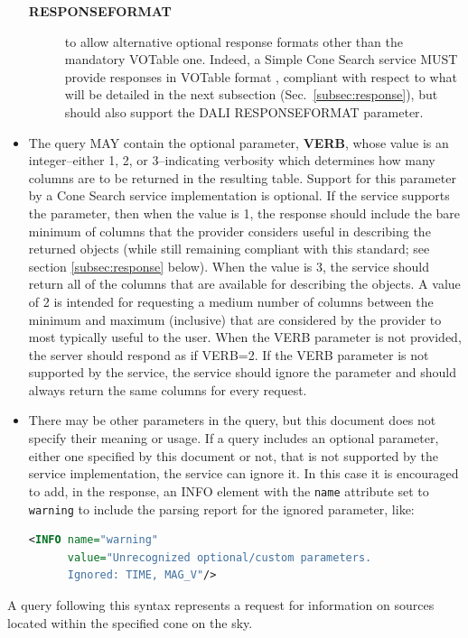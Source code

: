 \documentclass[11pt,a4paper]{ivoa}
\begin{document}
\begin{itemize}
\begin{description}
				\item[\textbf{RESPONSEFORMAT}] to allow alternative optional response
					formats other than the mandatory VOTable one. Indeed, a Simple
					Cone Search service MUST provide responses in VOTable format \citep{2025ivoa.spec.0116O},
					compliant with respect to what will
					be detailed in the next subsection (Sec.~\ref{subsec:response}), but should also
					support the DALI RESPONSEFORMAT parameter.
			\end{description}
		\item The query MAY contain the optional parameter,
			\textbf{VERB}, whose value is an integer--either 1, 2, or 3--indicating
			verbosity which determines how many columns are to be returned in the
			resulting table. Support for this parameter by a Cone Search service
			implementation is optional. If the service supports the parameter, then
			when the value is 1, the response should include the bare minimum of
			columns that the provider considers useful in describing the returned
			objects (while still remaining compliant with this standard; see section
			\ref{subsec:response} below). When the value is 3, the service should return all of the
			columns that are available for describing the objects. A value of 2 is
			intended for requesting a medium number of columns between the minimum
			and maximum (inclusive) that are considered by the provider to most
			typically useful to the user. When the VERB parameter is not provided,
			the server should respond as if VERB=2. If the VERB parameter is not
			supported by the service, the service should ignore the parameter and
			should always return the same columns for every request.
		\item There may be other parameters in the query, but this document does not
			specify their meaning or usage. If a query includes an optional parameter,
			either one specified by this document or not, that is not supported by
			the service implementation, the service can ignore it. In this
			case it is encouraged to add, in the response, an INFO element with the
			\verb|name| attribute set to \verb|warning| to include the parsing report
			for the ignored parameter, like:
			\begin{lstlisting}[language=XML]
<INFO name="warning" 
      value="Unrecognized optional/custom parameters.
      Ignored: TIME, MAG_V"/>
			\end{lstlisting}
	\end{itemize}
	
	A query following this syntax represents a request for
	information on sources located within the specified cone on the sky.
\end{document}
